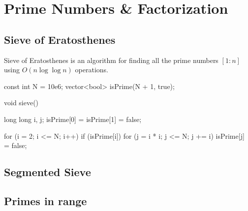 \chapter{Prime Numbers \& Factorization}

\section{Sieve of Eratosthenes}
Sieve of Eratosthenes is an algorithm for finding all the prime numbers $[1:n]$ using $O(n \log \log n)$ operations.

\begin{code}
const int N = 10e6;
vector<bool> isPrime(N + 1, true);

void sieve(){
   long long i, j;
   isPrime[0] = isPrime[1] = false;

   for (i = 2; i <= N; i++){
      if (isPrime[i]){
         for (j = i * i; j <= N; j += i)
            isPrime[j] = false;
      }
   }
}
\end{code}

\section{Segmented Sieve}

\section{Primes in range}